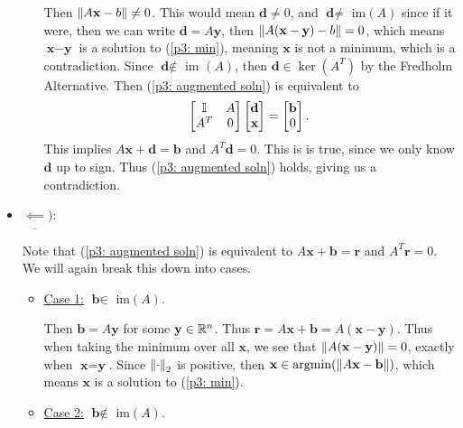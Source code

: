 \begin{solution}
\begin{itemize}
\begin{itemize}
            Then $\norm{A\textbf{x} - b} \neq 0$. This would mean $\textbf{d} \neq 0$, and $\textbf{d} \neq $ im$(A)$ since if it were, then we can write $\textbf{d} = A\textbf{y}$, then $\norm{A(\textbf{x} - \textbf{y}) - b} = 0$, which means $\textbf{x} - \textbf{y}$ is a solution to (\ref{p3: min}), meaning $\textbf{x}$ is not a minimum, which is a contradiction. Since $\textbf{d} \notin$ im $(A)$, then $\textbf{d} \in \ker (A^T)$ by the Fredholm Alternative. Then (\ref{p3: augmented soln}) is equivalent to
            \[
            \begin{bmatrix}\mathbb{I} &A\\ A^T& 0\end{bmatrix}\begin{bmatrix}\textbf{d}\\ \textbf{x}\end{bmatrix} = \begin{bmatrix}\textbf{b}\\0\end{bmatrix}.
            \]
            This implies $A\textbf{x} + \textbf{d} = \textbf{b}$ and $A^T\textbf{d} = 0$. This is is true, since we only know $\textbf{d}$ up to sign. Thus (\ref{p3: augmented soln}) holds, giving us a contradiction. 
        \end{itemize}

        \item $\underline{\impliedby}):$

        Note that (\ref{p3: augmented soln}) is equivalent to $A\textbf{x} + \textbf{b} = \textbf{r}$ and $A^T\textbf{r} = 0$. We will again break this down into cases. 

        \begin{itemize}
            \item \underline{Case 1:} $\textbf{b} \in $ im$(A)$. 

            Then $\textbf{b} = A\textbf{y}$ for some $\textbf{y} \in \mathbb{R}^n$. Thus $\textbf{r}= A\textbf{x} + \textbf{b} = A(\textbf{x} - \textbf{y})$. Thus when taking the minimum over all $\textbf{x}$, we see that $\norm{A(\textbf{x} - \textbf{y})} = 0$, exactly when $\textbf{x} = \textbf{y}$. Since $\norm{\cdot}_2$ is positive, then $\textbf{x} \in \operatorname*{argmin} (\norm{A\textbf{x} - \textbf{b}})$, which means $\textbf{x}$ is a solution to (\ref{p3: min}).

            \item \underline{Case 2:} $\textbf{b}\notin$ im$(A)$.


\end{itemize}
\end{itemize}
\end{solution}
